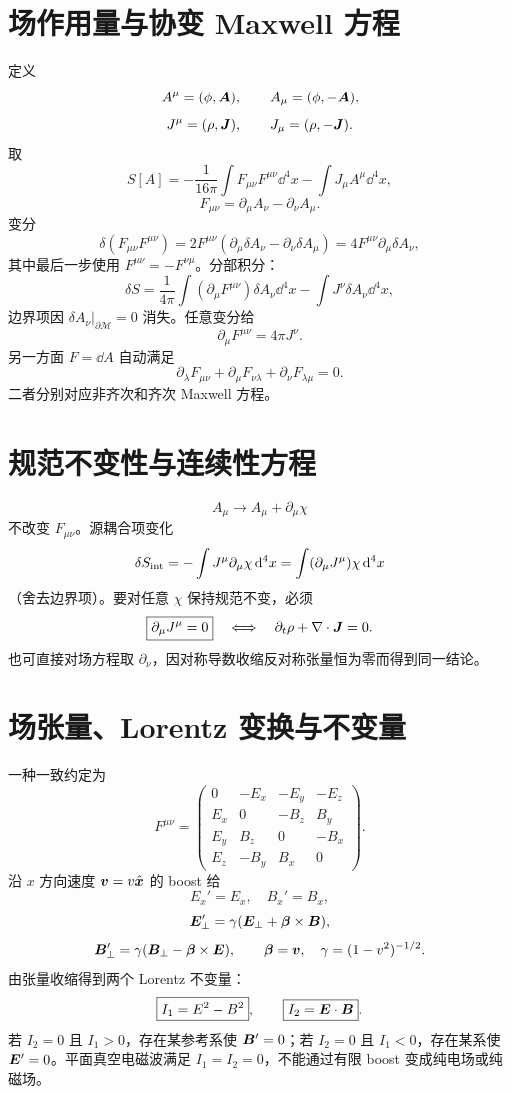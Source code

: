 \section{场作用量与协变 Maxwell 方程}
定义
\[
A^\mu=(\phi,\bm{A}),\qquad A_\mu=(\phi,-\bm{A}),
\]
\[
J^\mu=(\rho,\bm{J}),\qquad J_\mu=(\rho,-\bm{J}).
\]
取
\[
S[A]=-\frac1{16\pi}\int F_{\mu\nu}F^{\mu\nu}\dd^4x
-\int J_\mu A^\mu\dd^4x,
\]
\[
F_{\mu\nu}=\partial_\mu A_\nu-\partial_\nu A_\mu.
\]
变分
\[
\delta(F_{\mu\nu}F^{\mu\nu})
=2F^{\mu\nu}(\partial_\mu\delta A_\nu-\partial_\nu\delta A_\mu)
=4F^{\mu\nu}\partial_\mu\delta A_\nu,
\]
其中最后一步使用 $F^{\mu\nu}=-F^{\nu\mu}$。分部积分：
\[
\delta S=
\frac1{4\pi}\int(\partial_\mu F^{\mu\nu})\delta A_\nu\dd^4x
-\int J^\nu\delta A_\nu\dd^4x,
\]
边界项因 $\delta A_\nu|_{\partial\mathcal M}=0$ 消失。任意变分给
\[
\boxed{\partial_\mu F^{\mu\nu}=4\pi J^\nu}.
\]
另一方面 $F=\dd A$ 自动满足
\[
\boxed{\partial_\lambda F_{\mu\nu}
+\partial_\mu F_{\nu\lambda}
+\partial_\nu F_{\lambda\mu}=0}.
\]
二者分别对应非齐次和齐次 Maxwell 方程。

\section{规范不变性与连续性方程}
\[
A_\mu\to A_\mu+\partial_\mu\chi
\]
不改变 $F_{\mu\nu}$。源耦合项变化
\[
\delta S_{\rm int}
=-\int J^\mu\partial_\mu\chi\,\mathrm d^4x
=\int(\partial_\mu J^\mu)\chi\,\mathrm d^4x
\]
（舍去边界项）。要对任意 $\chi$ 保持规范不变，必须
\[
\boxed{\partial_\mu J^\mu=0}
\quad\Longleftrightarrow\quad
\partial_t\rho+\nabla\cdot\bm{J}=0.
\]
也可直接对场方程取 $\partial_\nu$，因对称导数收缩反对称张量恒为零而得到同一结论。

\section{场张量、Lorentz 变换与不变量}
一种一致约定为
\[
F^{\mu\nu}=
\begin{pmatrix}
0&-E_x&-E_y&-E_z\\
E_x&0&-B_z&B_y\\
E_y&B_z&0&-B_x\\
E_z&-B_y&B_x&0
\end{pmatrix}.
\]
沿 $x$ 方向速度 $\bm{v}=v\hat{\bm{x}}$ 的 boost 给
\[
E_x'=E_x,\quad B_x'=B_x,
\]
\[
\bm{E}_\perp'=\gamma(\bm{E}_\perp+\bm{\beta}\times\bm{B}),
\]
\[
\bm{B}_\perp'=\gamma(\bm{B}_\perp-\bm{\beta}\times\bm{E}),
\qquad \bm{\beta}=\bm{v},\quad \gamma=(1-v^2)^{-1/2}.
\]
由张量收缩得到两个 Lorentz 不变量：
\[
\boxed{I_1=E^2-B^2},\qquad
\boxed{I_2=\bm{E}\cdot\bm{B}}.
\]
若 $I_2=0$ 且 $I_1>0$，存在某参考系使 $\bm{B}'=0$；若
$I_2=0$ 且 $I_1<0$，存在某系使 $\bm{E}'=0$。平面真空电磁波满足
$I_1=I_2=0$，不能通过有限 boost 变成纯电场或纯磁场。

